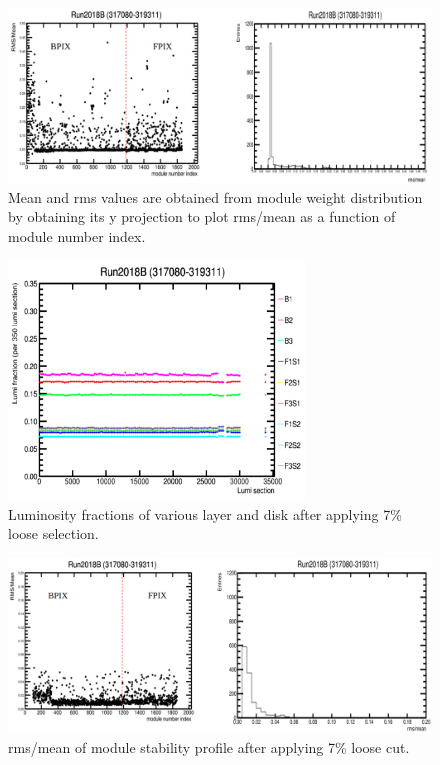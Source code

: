 \begin{figure}[!htp]
\centering
\includegraphics[width=1\textwidth]{ashish_thesis/rms_mean_all_modules_B.png}
\caption{%
   Mean and rms values are obtained from module weight distribution by obtaining its y projection to plot rms/mean as a function of module number index.
}
\label{fig:rms_mean_B}
\end{figure}




\begin{figure}[!htp]
\centering
\includegraphics[width=0.7\textwidth]{ashish_thesis/first_iteration_stability.png}
\caption{%
   Luminosity fractions of various layer and disk after applying 7\% loose selection.
}
\label{fig:f_it_stability}
\end{figure}

\begin{figure}[!htp]
\centering
\includegraphics[width=1\textwidth]{ashish_thesis/remaining_second_iteration.png}
\caption{%
 rms/mean of module stability profile after applying 7\% loose cut.
}
\label{fig:sec_it_remain}
\end{figure}


